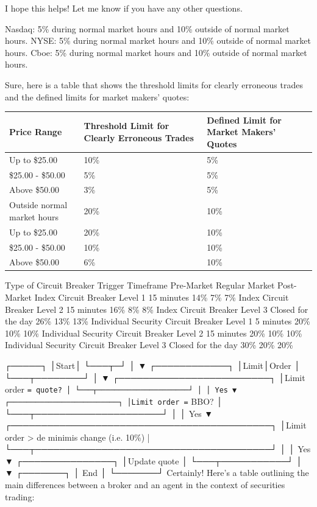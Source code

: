 \documentclass[11pt]{article}
\begin{document}
I hope this helps! Let me know if you have any other questions.

Nasdaq: 5\% during normal market hours and 10\% outside of normal market hours.
NYSE: 5\% during normal market hours and 10\% outside of normal market hours.
Cboe: 5\% during normal market hours and 10\% outside of normal market hours.


Sure, here is a table that shows the threshold limits for clearly erroneous trades and the defined limits for market makers' quotes:

\begin{center}
\begin{tabular}{lll}
\textbf{\textbf{Price Range}} & \textbf{\textbf{Threshold Limit for Clearly Erroneous Trades}} & \textbf{\textbf{Defined Limit for Market Makers' Quotes}}\\[0pt]
\hline
Up to \$25.00 & 10\% & 5\%\\[0pt]
\$25.00 - \$50.00 & 5\% & 5\%\\[0pt]
Above \$50.00 & 3\% & 5\%\\[0pt]
Outside normal market hours & 20\% & 10\%\\[0pt]
\hline
Up to \$25.00 & 20\% & 10\%\\[0pt]
\$25.00 - \$50.00 & 10\% & 10\%\\[0pt]
Above \$50.00 & 6\% & 10\%\\[0pt]
\end{tabular}
\end{center}



Type of Circuit Breaker	Trigger	Timeframe	Pre-Market	Regular Market	Post-Market
Index Circuit Breaker	Level 1	15 minutes	14\%	7\%	7\%
Index Circuit Breaker	Level 2	15 minutes	16\%	8\%	8\%
Index Circuit Breaker	Level 3	Closed for the day	26\%	13\%	13\%
Individual Security Circuit Breaker	Level 1	5 minutes	20\%	10\%	10\%
Individual Security Circuit Breaker	Level 2	15 minutes	20\%	10\%	10\%
Individual Security Circuit Breaker	Level 3	Closed for the day	30\%	20\%	20\%


┌─────┐
│Start│
└───┬─┘
    │
    ▼
┌────────────┐
│Limit│Order │
└───┬────────┘
    │
    ▼
┌─────────────────────────┐
│Limit order \texttt{= quote?    │
└───┬─────────────────────┘
    │
    │ Yes
    ▼
┌─────────────────────────┐
│Limit order =} BBO?      │
└───┬─────────────────────┘
    │
    │ Yes
    ▼
┌───────────────────────────────────────────┐
│Limit order > de minimis change (i.e. 10\%) |
└───┬───────────────────────────────────────┘
    │
    │ Yes
    ▼
┌───────────────┐
│Update quote   │
└───┬───────────┘
    │
    ▼
┌───────┐
│  End  │
└───────┘
Certainly! Here's a table outlining the main differences between a broker and an agent in the context of securities trading:
\end{document}
